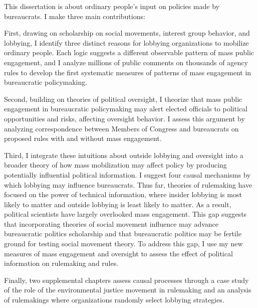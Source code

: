 This dissertation is about ordinary people's input on policies made by bureaucrats. 
I make three main contributions:

First, drawing on scholarship on social movements, interest group behavior, and lobbying, I identify three distinct reasons for lobbying organizations to mobilize ordinary people. Each logic suggests a different observable pattern of mass public engagement, and I analyze millions of public comments on thousands of agency rules to develop the first systematic measures of patterns of mass engagement in bureaucratic policymaking. 

Second, building on theories of political oversight, I theorize that mass public engagement in bureaucratic policymaking may alert elected officials to political opportunities and risks, affecting oversight behavior. I assess this argument by analyzing correspondence between Members of Congress and bureaucrats on proposed rules with and without mass engagement.

Third, I integrate these intuitions about outside lobbying and oversight into a broader theory of how mass mobilization may affect policy by producing potentially influential political information. I suggest four causal mechanisms by which lobbying may influence bureaucrats. Thus far, theories of rulemaking have focused on the power of technical information, where insider lobbying is most likely to matter and outside lobbying is least likely to matter. As a result, political scientists have largely overlooked mass engagement. This gap suggests that incorporating theories of social movement influence may advance bureaucratic politics scholarship and that bureaucratic politics may be fertile ground for testing social movement theory. To address this gap, I use my new measures of mass engagement and oversight to assess the effect of political information on rulemaking and rules.%

Finally, two supplemental chapters assess causal processes through a case study of the role of the environmental justice movement in rulemaking and an analysis of rulemakings where organizations randomly select lobbying strategies.

